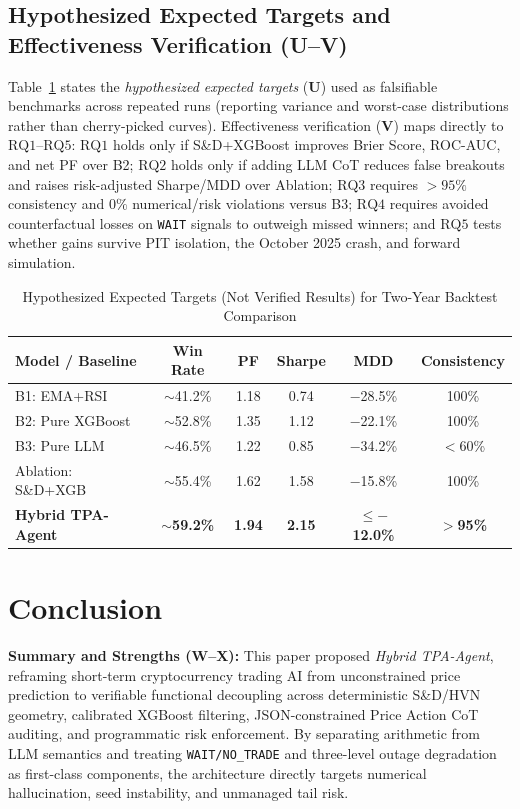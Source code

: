 \documentclass[conference]{IEEEtran}
\begin{document}
\subsection{Hypothesized Expected Targets and Effectiveness Verification (U--V)}
Table~\ref{tab:targets} states the \textit{hypothesized expected targets} (\textbf{U}) used as falsifiable benchmarks across repeated runs (reporting variance and worst-case distributions rather than cherry-picked curves). Effectiveness verification (\textbf{V}) maps directly to $\mathrm{RQ1}$--$\mathrm{RQ5}$: $\mathrm{RQ1}$ holds only if S\&D+XGBoost improves Brier Score, ROC-AUC, and net PF over B2; $\mathrm{RQ2}$ holds only if adding LLM CoT reduces false breakouts and raises risk-adjusted Sharpe/MDD over Ablation; $\mathrm{RQ3}$ requires $>95\%$ consistency and $0\%$ numerical/risk violations versus B3; $\mathrm{RQ4}$ requires avoided counterfactual losses on \texttt{WAIT} signals to outweigh missed winners; and $\mathrm{RQ5}$ tests whether gains survive PIT isolation, the October 2025 crash, and forward simulation.

\begin{table}[t]
\centering
\caption{Hypothesized Expected Targets (Not Verified Results) for Two-Year Backtest Comparison}
\label{tab:targets}
\scriptsize
\setlength{\tabcolsep}{3.5pt}
\begin{tabular}{p{2.2cm} c c c c c}
\toprule
\textbf{Model / Baseline} & \textbf{Win Rate} & \textbf{PF} & \textbf{Sharpe} & \textbf{MDD} & \textbf{Consistency} \\
\midrule
B1: EMA+RSI & $\sim$41.2\% & 1.18 & 0.74 & $-$28.5\% & 100\% \\
B2: Pure XGBoost & $\sim$52.8\% & 1.35 & 1.12 & $-$22.1\% & 100\% \\
B3: Pure LLM & $\sim$46.5\% & 1.22 & 0.85 & $-$34.2\% & $<$60\% \\
Ablation: S\&D+XGB & $\sim$55.4\% & 1.62 & 1.58 & $-$15.8\% & 100\% \\
\textbf{Hybrid TPA-Agent} & \textbf{$\sim$59.2\%} & \textbf{1.94} & \textbf{2.15} & \textbf{$\le -$12.0\%} & \textbf{$>$95\%} \\
\bottomrule
\end{tabular}
\end{table}

\section{Conclusion}
\label{sec:conclusion}

\textbf{Summary and Strengths (W--X):} This paper proposed \textit{Hybrid TPA-Agent}, reframing short-term cryptocurrency trading AI from unconstrained price prediction to verifiable functional decoupling across deterministic S\&D/HVN geometry, calibrated XGBoost filtering, JSON-constrained Price Action CoT auditing, and programmatic risk enforcement. By separating arithmetic from LLM semantics and treating \texttt{WAIT/NO\_TRADE} and three-level outage degradation as first-class components, the architecture directly targets numerical hallucination, seed instability, and unmanaged tail risk.
\end{document}
